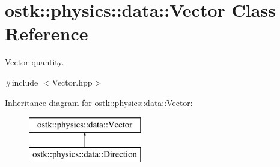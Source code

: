 \hypertarget{classostk_1_1physics_1_1data_1_1_vector}{}\section{ostk\+:\+:physics\+:\+:data\+:\+:Vector Class Reference}
\label{classostk_1_1physics_1_1data_1_1_vector}


\hyperlink{classostk_1_1physics_1_1data_1_1_vector}{Vector} quantity.  




{\ttfamily \#include $<$Vector.\+hpp$>$}

Inheritance diagram for ostk\+:\+:physics\+:\+:data\+:\+:Vector\+:\begin{figure}[H]
\begin{center}
\leavevmode
\includegraphics[height=2.000000cm]{classostk_1_1physics_1_1data_1_1_vector}
\end{center}
\end{figure}
